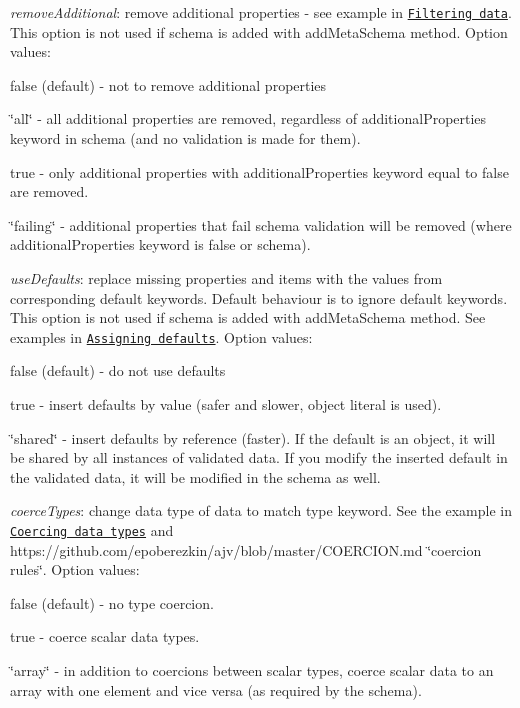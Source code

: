 \begin{DoxyItemize}
\item {\itshape remove\+Additional}\+: remove additional properties -\/ see example in \href{#filtering-data}{\tt Filtering data}. This option is not used if schema is added with {\ttfamily add\+Meta\+Schema} method. Option values\+:
\begin{DoxyItemize}
\item {\ttfamily false} (default) -\/ not to remove additional properties
\item {\ttfamily \char`\"{}all\char`\"{}} -\/ all additional properties are removed, regardless of {\ttfamily additional\+Properties} keyword in schema (and no validation is made for them).
\item {\ttfamily true} -\/ only additional properties with {\ttfamily additional\+Properties} keyword equal to {\ttfamily false} are removed.
\item {\ttfamily \char`\"{}failing\char`\"{}} -\/ additional properties that fail schema validation will be removed (where {\ttfamily additional\+Properties} keyword is {\ttfamily false} or schema).
\end{DoxyItemize}
\item {\itshape use\+Defaults}\+: replace missing properties and items with the values from corresponding {\ttfamily default} keywords. Default behaviour is to ignore {\ttfamily default} keywords. This option is not used if schema is added with {\ttfamily add\+Meta\+Schema} method. See examples in \href{#assigning-defaults}{\tt Assigning defaults}. Option values\+:
\begin{DoxyItemize}
\item {\ttfamily false} (default) -\/ do not use defaults
\item {\ttfamily true} -\/ insert defaults by value (safer and slower, object literal is used).
\item {\ttfamily \char`\"{}shared\char`\"{}} -\/ insert defaults by reference (faster). If the default is an object, it will be shared by all instances of validated data. If you modify the inserted default in the validated data, it will be modified in the schema as well.
\end{DoxyItemize}
\item {\itshape coerce\+Types}\+: change data type of data to match {\ttfamily type} keyword. See the example in \href{#coercing-data-types}{\tt Coercing data types} and https\+://github.com/epoberezkin/ajv/blob/master/\+C\+O\+E\+R\+C\+I\+O\+N.\+md \char`\"{}coercion rules\char`\"{}. Option values\+:
\begin{DoxyItemize}
\item {\ttfamily false} (default) -\/ no type coercion.
\item {\ttfamily true} -\/ coerce scalar data types.
\item {\ttfamily \char`\"{}array\char`\"{}} -\/ in addition to coercions between scalar types, coerce scalar data to an array with one element and vice versa (as required by the schema).
\end{DoxyItemize}
\end{DoxyItemize}

